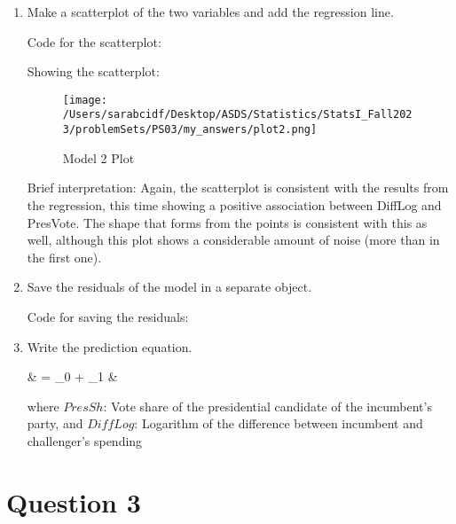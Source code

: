 \documentclass[12pt,letterpaper]{article}
\begin{document}
\begin{enumerate}
		\item Make a scatterplot of the two variables and add the regression line. \vspace{0.25cm}
		
		Code for the scatterplot: 
		
		
		Showing the scatterplot: 
		\begin{figure}[H]
			\centering
			\texttt{[image: /Users/sarabcidf/Desktop/ASDS/Statistics/StatsI\_Fall2023/problemSets/PS03/my\_answers/plot2.png]}
			\caption{Model 2 Plot}
		\end{figure}
		
		Brief interpretation: 
		Again, the scatterplot is consistent with the results from the regression, this time showing a positive association between DiffLog and PresVote. The shape that forms from the points is consistent with this as well, although this plot shows a considerable amount of noise (more than in the first one).
		
		\item Save the residuals of the model in a separate object.	\vspace{0.25cm}
		
		Code for saving the residuals: 
		
		
		\item Write the prediction equation.
		
		{\setlength{\abovedisplayskip}{2pt} 
			\setlength{\belowdisplayskip}{6pt} 
			
			\begin{flalign*}
				& = \beta_0 + \beta_1 \cdot {}  &
			\end{flalign*}
			
			where $PresSh$: Vote share of the presidential candidate of the incumbent's party, and $DiffLog$: Logarithm of the difference between incumbent and challenger's spending
		} 
		
	\end{enumerate}
	
	\newpage	
\section*{Question 3}
\end{document}
